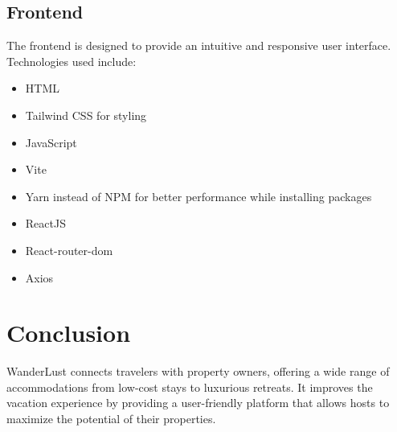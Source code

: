 \documentclass[12pt]{article}
\begin{document}
\subsection{Frontend}
The frontend is designed to provide an intuitive and responsive user interface. Technologies used include:
\begin{itemize}
    \item HTML
    \item Tailwind CSS for styling
    \item JavaScript
    \item Vite
    \item Yarn instead of NPM for better performance while installing packages
    \item ReactJS
    \item React-router-dom
    \item Axios
\end{itemize}

\section{Conclusion}
WanderLust connects travelers with property owners, offering a wide range of accommodations from low-cost stays to luxurious retreats. It improves the vacation experience by providing a user-friendly platform that allows hosts to maximize the potential of their properties.
\end{document}
